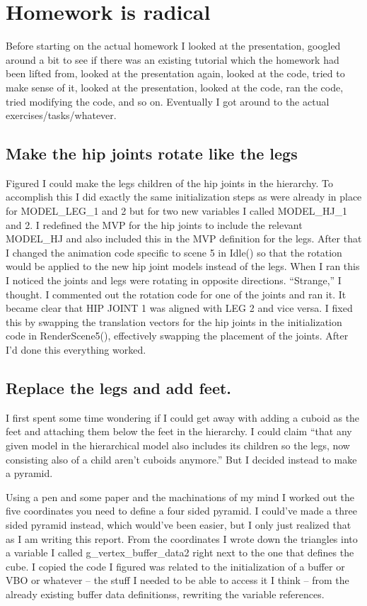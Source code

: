\section{Homework is radical}
Before starting on the actual homework I looked at the presentation, googled around a bit to see if there was an existing tutorial which the homework had been lifted from, looked at the presentation again, looked at the code, tried to make sense of it, looked at the presentation, looked at the code, ran the code, tried modifying the code, and so on.
Eventually I got around to the actual exercises/tasks/whatever.

\subsection{Make the hip joints rotate like the legs}
Figured I could make the legs children of the hip joints in the hierarchy.
To accomplish this I did exactly the same initialization steps as were already in place for MODEL\_LEG\_1 and 2 but for two new variables I called MODEL\_HJ\_1 and 2.
I redefined the MVP for the hip joints to include the relevant MODEL\_HJ and also included this in the MVP definition for the legs.
After that I changed the animation code specific to scene 5 in Idle() so that the rotation would be applied to the new hip joint models instead of the legs.
When I ran this I noticed the joints and legs were rotating in opposite directions.
``Strange,'' I thought.
I commented out the rotation code for one of the joints and ran it.
It became clear that HIP JOINT 1 was aligned with LEG 2 and vice versa.
I fixed this by swapping the translation vectors for the hip joints in the initialization code in RenderScene5(), effectively swapping the placement of the joints.
After I'd done this everything worked.

\subsection{Replace the legs and add feet.}
I first spent some time wondering if I could get away with adding a cuboid as the feet and attaching them below the feet in the hierarchy.
I could claim ``that any given model in the hierarchical model also includes its children so the legs, now consisting also of a child aren't cuboids anymore.''
But I decided instead to make a pyramid.

Using a pen and some paper and the machinations of my mind I worked out the five coordinates you need to define a four sided pyramid.
I could've made a three sided pyramid instead, which would've been easier, but I only just realized that as I am writing this report.
From the coordinates I wrote down the triangles into a variable I called g\_vertex\_buffer\_data2 right next to the one that defines the cube.
I copied the code I figured was related to the initialization of a buffer or VBO or whatever -- the stuff I needed to be able to access it I think -- from the already existing buffer data definitionss, rewriting the variable references.

